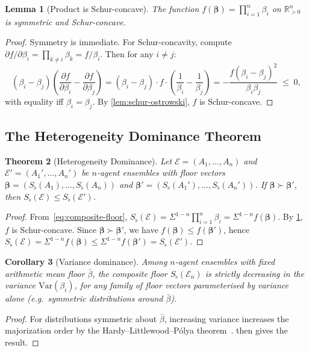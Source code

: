 \documentclass[twocolumn,11pt,a4paper]{article}
\newtheorem{theorem}{Theorem}[section]
\newtheorem{lemma}[theorem]{Lemma}
\newtheorem{corollary}[theorem]{Corollary}
\theoremstyle{remark}
\newcommand{\R}{\mathbb{R}}
\newcommand{\Sflat}{S_{\flat}}
\newcommand{\Ens}{\mathcal{E}}
\newcommand{\Var}{\mathrm{Var}}           %
\begin{document}
\begin{lemma}[Product is Schur-concave]
\label{lem:product-schur}
The function $f(\boldsymbol\beta) = \prod_{i=1}^n \beta_i$ on $\R_{>0}^n$
is symmetric and Schur-concave.
\end{lemma}
\begin{proof}
Symmetry is immediate.  For Schur-concavity, compute
$\partial f/\partial \beta_i = \prod_{k\ne i} \beta_k = f/\beta_i$.
Then for any $i \neq j$:
\[
  (\beta_i - \beta_j)\!\left(\frac{\partial f}{\partial \beta_i}
  - \frac{\partial f}{\partial \beta_j}\right)
  = (\beta_i - \beta_j) \cdot f \cdot
    \left(\frac{1}{\beta_i} - \frac{1}{\beta_j}\right)
  = -\frac{f(\beta_i - \beta_j)^2}{\beta_i\beta_j}
  \;\le\; 0,
\]
with equality iff $\beta_i = \beta_j$.  By \cref{lem:schur-ostrowski},
$f$ is Schur-concave.
\end{proof}

\subsection{The Heterogeneity Dominance Theorem}
\label{sec:dominance:thm}

\begin{theorem}[Heterogeneity Dominance]
\label{thm:dominance}
Let $\Ens = (A_1,\ldots,A_n)$ and $\Ens' = (A_1',\ldots,A_n')$ be
$n$-agent ensembles with floor vectors
$\boldsymbol\beta = (\Sflat(A_1),\ldots,\Sflat(A_n))$ and
$\boldsymbol\beta' = (\Sflat(A_1'),\ldots,\Sflat(A_n'))$.
If $\boldsymbol\beta \succ \boldsymbol\beta'$, then
$\Sflat(\Ens) \le \Sflat(\Ens')$.
\end{theorem}
\begin{proof}
From~\eqref{eq:composite-floor},
$\Sflat(\Ens) = \Sigma^{1-n}\prod_{i=1}^n \beta_i = \Sigma^{1-n} f(\boldsymbol\beta)$.
By \cref{lem:product-schur}, $f$ is Schur-concave.  Since
$\boldsymbol\beta \succ \boldsymbol\beta'$, we have
$f(\boldsymbol\beta) \le f(\boldsymbol\beta')$, hence
$\Sflat(\Ens) = \Sigma^{1-n}f(\boldsymbol\beta) \le
\Sigma^{1-n}f(\boldsymbol\beta') = \Sflat(\Ens')$.
\end{proof}

\begin{corollary}[Variance dominance]
\label{cor:variance}
Among $n$-agent ensembles with fixed arithmetic mean floor $\bar\beta$, the
composite floor $\Sflat(\Ens_n)$ is strictly decreasing in the variance
$\Var(\beta_i)$, for any family of floor vectors parameterised by variance
alone (e.g.\ symmetric distributions around $\bar\beta$).
\end{corollary}
\begin{proof}
For distributions symmetric about $\bar\beta$, increasing variance increases
the majorization order by the Hardy--Littlewood--P\'olya
theorem~\cite{hlp1952}.   then gives the result.
\end{proof}
\end{document}
